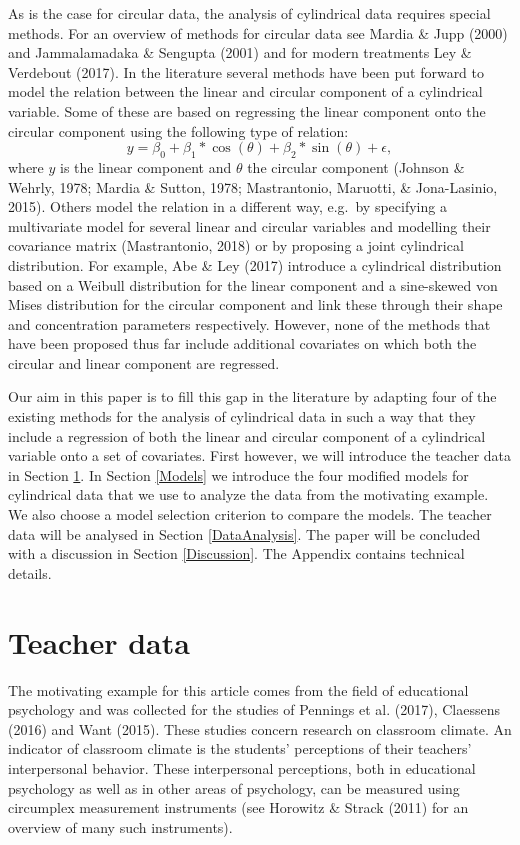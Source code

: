 \documentclass[11pt,]{article}
\begin{document}
As is the case for circular data, the analysis of cylindrical data
requires special methods. For an overview of methods for circular data
see Mardia \& Jupp (2000) and Jammalamadaka \& Sengupta (2001) and for
modern treatments Ley \& Verdebout (2017). In the literature several
methods have been put forward to model the relation between the linear
and circular component of a cylindrical variable. Some of these are
based on regressing the linear component onto the circular component
using the following type of relation: \[y = \beta_0 + 
\beta_1*\cos(\theta) + \beta_2*\sin(\theta)+ \epsilon,\] where \(y\) is
the linear component and \(\theta\) the circular component (Johnson \&
Wehrly, 1978; Mardia \& Sutton, 1978; Mastrantonio, Maruotti, \&
Jona-Lasinio, 2015). Others model the relation in a different way,
e.g.~by specifying a multivariate model for several linear and circular
variables and modelling their covariance matrix (Mastrantonio, 2018) or
by proposing a joint cylindrical distribution. For example, Abe \& Ley
(2017) introduce a cylindrical distribution based on a Weibull
distribution for the linear component and a sine-skewed von Mises
distribution for the circular component and link these through their
shape and concentration parameters respectively. However, none of the
methods that have been proposed thus far include additional covariates
on which both the circular and linear component are regressed.

Our aim in this paper is to fill this gap in the literature by adapting
four of the existing methods for the analysis of cylindrical data in
such a way that they include a regression of both the linear and
circular component of a cylindrical variable onto a set of covariates.
First however, we will introduce the teacher data in Section
\ref{Example}. In Section \ref{Models} we introduce the four modified
models for cylindrical data that we use to analyze the data from the
motivating example. We also choose a model selection criterion to
compare the models. The teacher data will be analysed in Section
\ref{DataAnalysis}. The paper will be concluded with a discussion in
Section \ref{Discussion}. The Appendix contains technical details.

\section{Teacher data}\label{Example}

The motivating example for this article comes from the field of
educational psychology and was collected for the studies of Pennings et
al. (2017), Claessens (2016) and Want (2015). These studies concern
research on classroom climate. An indicator of classroom climate is the
students' perceptions of their teachers' interpersonal behavior. These
interpersonal perceptions, both in educational psychology as well as in
other areas of psychology, can be measured using circumplex measurement
instruments (see Horowitz \& Strack (2011) for an overview of many such
instruments).
\end{document}
